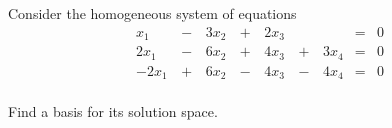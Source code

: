 \begin{activity}{10}
Consider the homogeneous system of equations
\begin{alignat*}{5}
x_1&\,-\,&3x_2&\,+\,& 2x_3&\,\,&  &=& 0 \\
2x_1&\,-\,&6x_2&\,+\,&4x_3 &\,+\,&3 x_4 &=& 0 \\
-2x_1&\,+\,&6x_2&\,-\,&4x_3 &\,-\,&4 x_4 &=& 0 \\
\end{alignat*}

Find a basis for its solution space.
\end{activity}



